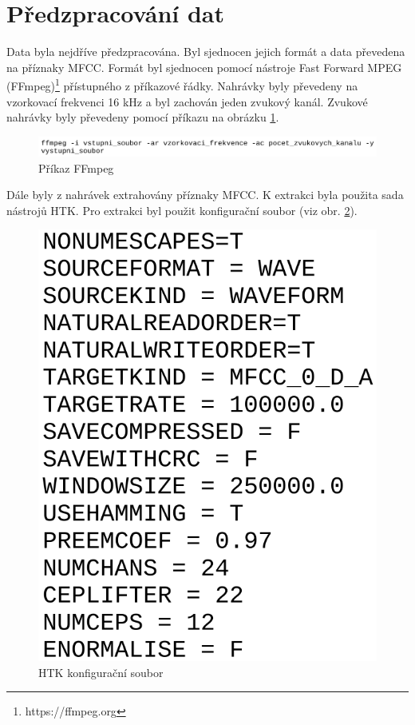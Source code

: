 \documentclass[FM,BP]{tulthesis}
\begin{document}
\section{Předzpracování dat} %
Data byla nejdříve předzpracována. Byl sjednocen jejich formát a data převedena na příznaky MFCC. Formát byl sjednocen pomocí nástroje Fast Forward MPEG (FFmpeg)\footnote{https://ffmpeg.org} přístupného z příkazové řádky. Nahrávky byly převedeny na vzorkovací frekvenci 16 kHz a byl zachován jeden zvukový kanál. Zvukové nahrávky byly převedeny pomocí příkazu na obrázku \mbox{\ref{fig:ffmpeg}}.

\begin{figure}[htbp]
\centerline{\includegraphics[width=\textwidth,height=\textheight,keepaspectratio]{ffmpeg_command.png}}
\caption{Příkaz FFmpeg}
\label{fig:ffmpeg}
\end{figure}
\FloatBarrier

Dále byly z nahrávek extrahovány příznaky MFCC. K extrakci byla použita sada nástrojů HTK. Pro extrakci byl použit konfigurační soubor (viz obr. \mbox{\ref{fig:htk_config})}.

\begin{figure}[htbp]
\centerline{\includegraphics[scale=.2,keepaspectratio]{htk_config.png}}
\caption{HTK konfigurační soubor}
\label{fig:htk_config}
\end{figure}
\FloatBarrier
\end{document}
